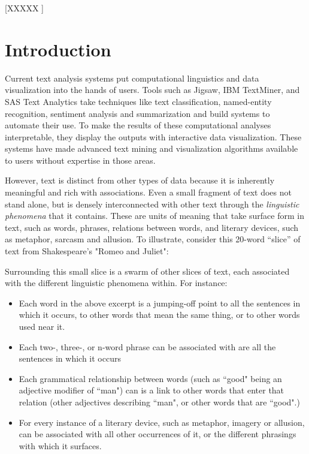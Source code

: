 \documentclass{sig-alternate}
\begin{document}
[XXXXX ]



\section{Introduction}
Current text analysis systems put computational linguistics and data visualization into the hands of users. Tools such as Jigsaw, IBM TextMiner, and SAS Text Analytics take techniques like text classification, named-entity recognition, sentiment analysis and summarization and build systems to automate their use. To make the results of these computational analyses interpretable, they display the outputs with interactive data visualization. These systems have made advanced text mining and visualization algorithms available to users without expertise in those areas.

However, text is distinct from other types of data because it is inherently meaningful and rich with associations.  Even a small fragment of text does not stand alone, but is densely interconnected with other text through the \emph{linguistic phenomena} that it contains. These are units of meaning that take surface form in text, such as words, phrases, relations between words, and literary devices, such as metaphor, sarcasm and allusion. To illustrate, consider this 20-word  ``slice'' of text from Shakespeare's "Romeo and Juliet":

\begin{quote}
\end{quote}

Surrounding this small slice is a swarm of other slices of text, each associated with the different linguistic phenomena within. For instance:
\begin{itemize}
\item Each word in the above excerpt is a jumping-off point to all the sentences in which it occurs, to other words that mean the same thing, or to other words used near it.
\item Each  two-, three-, or n-word phrase can be associated with are all the sentences in which it occurs
\item  Each grammatical relationship between words (such as ``good" being an adjective modifier of  ``man") can is a link to other words that enter that relation (other adjectives describing ``man", or other words that are ``good".)
\item For every instance of a literary device, such as metaphor, imagery or allusion, can be associated with all other occurrences of it, or the different phrasings with which it surfaces.
\end{itemize}
\end{document}
